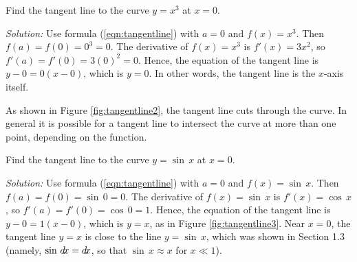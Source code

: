 \begin{exmp}\label{exmp:tangentline2}
 \piccaption[]{\label{fig:tangentline2}}
\noindent Find the tangent line to the curve $y = x^3$ at $x = 0$.\vspace{1mm}
\par\noindent\emph{Solution:} Use formula (\ref{eqn:tangentline}) with $a = 0$
and $f(x) = x^3$. Then $f(a) = f(0) = 0^3 = 0$. The derivative of $f(x) = x^3$
is $f'(x) = 3x^2$, so $f'(a) = f'(0) = 3(0)^2 = 0$. Hence, the equation of the
tangent line is ${y - 0 = 0(x - 0)}$, which is
$y = 0$. In other words, the tangent line is
the $x$-axis itself.\vspace{1mm}
\par\noindent As shown in Figure \ref{fig:tangentline2}, the tangent line cuts
through the curve. In general it is possible for a tangent line to intersect the
curve at more than one point, depending on the function.
\end{exmp}
\begin{exmp}\label{exmp:tangentline3}
 \piccaption[]{\label{fig:tangentline3}}
\noindent Find the tangent line to the curve $y = \sin\,x$ at $x = 0$.\vspace{1mm}
\par\noindent\emph{Solution:} Use formula (\ref{eqn:tangentline}) with $a = 0$
and $f(x) = \sin\,x$. Then $f(a) = f(0) = \sin\,0 = 0$. The derivative of
$f(x) = \sin\,x$ is $f'(x) = \cos\,x$, so $f'(a) = f'(0) = \cos\,0 = 1$. Hence,
the equation of the tangent line is ${y - 0 = 1(x - 0)}$, which is
$y = x$, as in Figure \ref{fig:tangentline3}.
Near $x = 0$, the tangent line $y = x$ is close to the line $y = \sin\,x$, which
was shown in Section 1.3 (namely, $\sin\,d\!x = d\!x$, so that $\sin\,x \approx x$
for $x \ll 1$).
\end{exmp}
